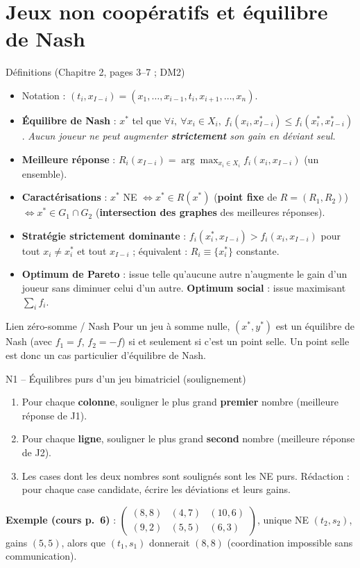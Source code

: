 \documentclass[11pt,a4paper]{article}
\begin{document}
\section{Jeux non coopératifs et équilibre de Nash}\label{sec:nash}

\begin{propbox}{Définitions (Chapitre 2, pages 3--7 ; DM2)}
\begin{itemize}[leftmargin=*]
\item Notation : $(t_i,x_{I-i})=(x_1,\dots,x_{i-1},t_i,x_{i+1},\dots,x_n)$.
\item \textbf{Équilibre de Nash} : $x^*$ tel que $\forall i,\ \forall x_i\in X_i,\ f_i(x_i,x^*_{I-i})\le f_i(x_i^*,x^*_{I-i})$. \emph{Aucun joueur ne peut augmenter \textbf{strictement} son gain en déviant seul.}
\item \textbf{Meilleure réponse} : $R_i(x_{I-i})=\arg\max_{x_i\in X_i}f_i(x_i,x_{I-i})$ (un ensemble).
\item \textbf{Caractérisations} : $x^*$ NE $\iff x^*\in R(x^*)$ (\textbf{point fixe} de $R=(R_1,R_2)$) $\iff x^*\in G_1\cap G_2$ (\textbf{intersection des graphes} des meilleures réponses).
\item \textbf{Stratégie strictement dominante} : $f_i(x_i^*,x_{I-i})>f_i(x_i,x_{I-i})$ pour tout $x_i\ne x_i^*$ et tout $x_{I-i}$ ; équivalent : $R_i\equiv\{x_i^*\}$ constante.
\item \textbf{Optimum de Pareto} : issue telle qu'aucune autre n'augmente le gain d'un joueur sans diminuer celui d'un autre. \textbf{Optimum social} : issue maximisant $\sum_if_i$.
\end{itemize}
\end{propbox}

\begin{propbox}{Lien zéro-somme / Nash}
Pour un jeu à somme nulle, $(x^*,y^*)$ est un équilibre de Nash (avec $f_1=f$, $f_2=-f$) si et seulement si c'est un point selle. Un point selle est donc un cas particulier d'équilibre de Nash.
\end{propbox}

\begin{methbox}{N1 -- Équilibres purs d'un jeu bimatriciel (soulignement)}
\begin{enumerate}[leftmargin=*]
\item Pour chaque \textbf{colonne}, souligner le plus grand \textbf{premier} nombre (meilleure réponse de J1).
\item Pour chaque \textbf{ligne}, souligner le plus grand \textbf{second} nombre (meilleure réponse de J2).
\item Les cases dont les deux nombres sont soulignés sont les NE purs. Rédaction : pour chaque case candidate, écrire les déviations et leurs gains.
\end{enumerate}
\textbf{Exemple (cours p.~6)} : $\begin{pmatrix}(8,8)&(4,7)&(10,6)\\(9,2)&(5,5)&(6,3)\end{pmatrix}$, unique NE $(t_2,s_2)$, gains $(5,5)$, alors que $(t_1,s_1)$ donnerait $(8,8)$ (coordination impossible sans communication).
\end{methbox}
\end{document}
